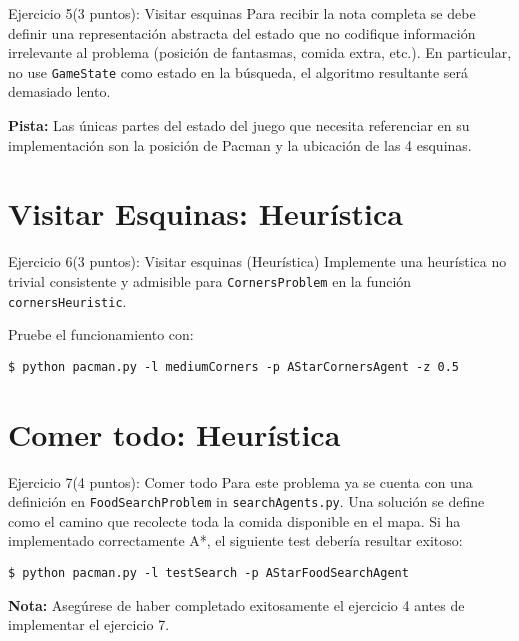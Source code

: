 \documentclass[10pt]{beamer}
\begin{document}
\begin{frame}[fragile]{Ejercicio 5(3 puntos): Visitar esquinas}
Para recibir la nota completa se debe definir una representación abstracta 
del estado que no codifique información irrelevante al problema (posición de fantasmas, comida extra, etc.). 
En particular, no use \texttt{GameState} como estado en la búsqueda, el algoritmo resultante 
será demasiado lento.

\textbf{Pista:} Las únicas partes del estado del juego que necesita referenciar en su implementación 
son la posición de Pacman y la ubicación de las 4 esquinas.

\end{frame}
\section{Visitar Esquinas: Heurística}


\begin{frame}[fragile]{Ejercicio 6(3 puntos): Visitar esquinas (Heurística)}
Implemente una heurística no trivial consistente y admisible para \texttt{CornersProblem} 
en la función \texttt{cornersHeuristic}.

Pruebe el funcionamiento con:

\begin{lstlisting}
$ python pacman.py -l mediumCorners -p AStarCornersAgent -z 0.5
\end{lstlisting}

\end{frame}
\section{Comer todo: Heurística}


\begin{frame}[fragile]{Ejercicio 7(4 puntos): Comer todo}
Para este problema ya se cuenta con una definición en \texttt{FoodSearchProblem} 
in \texttt{searchAgents.py}. Una solución se define como el camino que 
recolecte toda la comida disponible en el mapa. Si ha implementado correctamente 
A*, el siguiente test debería resultar exitoso:

\begin{lstlisting}
$ python pacman.py -l testSearch -p AStarFoodSearchAgent
\end{lstlisting}

\textbf{Nota:} Asegúrese de haber completado exitosamente el ejercicio 4 
antes de implementar el ejercicio 7.

\end{frame}
\end{document}
